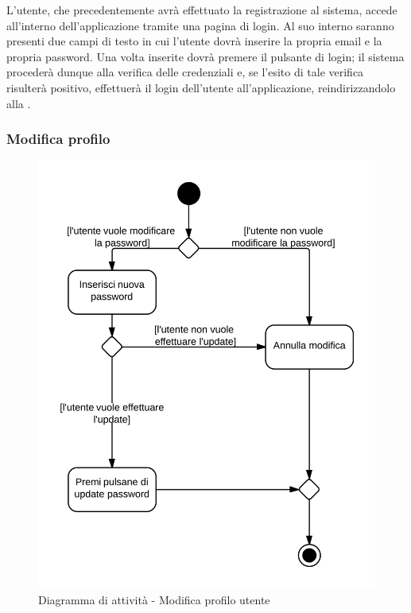 L'utente, che precedentemente avrà effettuato la registrazione al sistema, accede all'interno dell'applicazione tramite una pagina di login. Al suo interno saranno presenti due campi di testo in cui l'utente dovrà inserire la propria email e la propria password. Una volta inserite dovrà premere il pulsante di login; il sistema  procederà dunque alla verifica delle credenziali e, se l'esito di tale verifica risulterà positivo, effettuerà il login dell'utente all'applicazione, reindirizzandolo alla .

\subsubsection{Modifica profilo}

\begin{figure}[H]
\centering
\includegraphics[scale=0.1]{uml/attivita/MaaP - Modifica profilo.png}
\caption{Diagramma di attività - Modifica profilo utente}
\end{figure}

